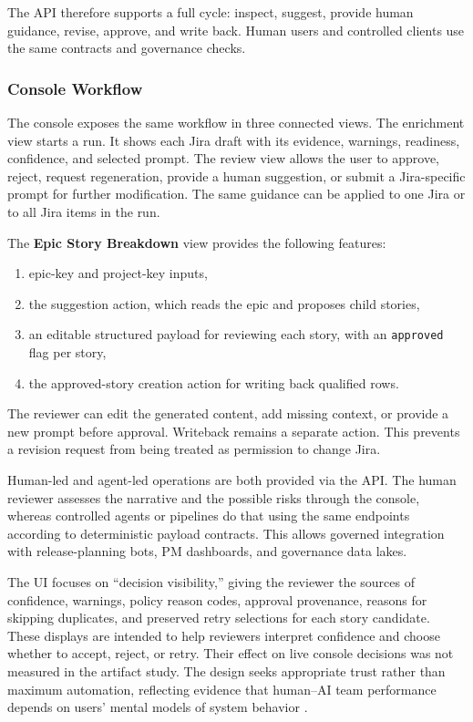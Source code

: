 \documentclass[pdflatex,sn-basic]{sn-jnl}
\begin{document}
The API therefore supports a full cycle: inspect, suggest, provide human guidance, revise, approve, and write back. Human users and controlled clients use the same contracts and governance checks.

\subsubsection{Console Workflow}
The console exposes the same workflow in three connected views. The enrichment view starts a run. It shows each Jira draft with its evidence, warnings, readiness, confidence, and selected prompt. The review view allows the user to approve, reject, request regeneration, provide a human suggestion, or submit a Jira-specific prompt for further modification. The same guidance can be applied to one Jira or to all Jira items in the run.

\begin{samepage}
The \textbf{Epic Story Breakdown} view provides the following features:
\begin{enumerate}
  \item epic-key and project-key inputs,
  \item the suggestion action, which reads the epic and proposes child stories,
  \item an editable structured payload for reviewing each story, with an \texttt{approved} flag per story,
  \item the approved-story creation action for writing back qualified rows.
\end{enumerate}
\end{samepage}

The reviewer can edit the generated content, add missing context, or provide a new prompt before approval. Writeback remains a separate action. This prevents a revision request from being treated as permission to change Jira.

Human-led and agent-led operations are both provided via the API. The human reviewer assesses the narrative and the possible risks through the console, whereas controlled agents or pipelines do that using the same endpoints according to deterministic payload contracts. This allows governed integration with release-planning bots, PM dashboards, and governance data lakes.

The UI focuses on ``decision visibility,'' giving the reviewer the sources of confidence, warnings, policy reason codes, approval provenance, reasons for skipping duplicates, and preserved retry selections for each story candidate. These displays are intended to help reviewers interpret confidence and choose whether to accept, reject, or retry. Their effect on live console decisions was not measured in the artifact study. The design seeks appropriate trust rather than maximum automation, reflecting evidence that human--AI team performance depends on users' mental models of system behavior \citep{R56,R57,R76}.
\end{document}
